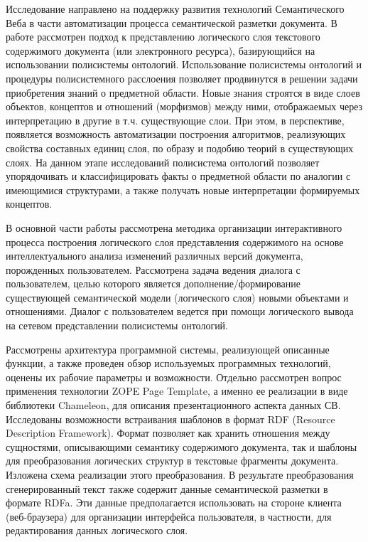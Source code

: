 \documentclass[utf8]{../IncArticle}
\newcommand{\e}[2][fcolor]{\textcolor{pcolor}{[}\textcolor{#1}{#2}\textcolor{pcolor}{]}}
\begin{document}

\conclusion


Исследование направлено на поддержку развития технологий
Семантического Веба в части автоматизации процесса семантической
разметки документа.  В работе рассмотрен подход к представлению
логического слоя текстового содержимого документа (или электронного
ресурса), базирующийся на использовании полисистемы онтологий.
Использование полисистемы онтологий и процедуры полисистемного
расслоения \cite{father} позволяет продвинутся в решении задачи
приобретения знаний о предметной области.  Новые знания строятся в
виде слоев объектов, концептов и отношений (морфизмов) между ними,
отображаемых через интерпретацию в другие в т.ч. существующие слои.
При этом, в перспективе, появляется возможность автоматизации
построения алгоритмов, реализующих свойства составных единиц слоя, по
образу и подобию теорий в существующих слоях.  На данном этапе
исследований полисистема онтологий позволяет упорядочивать и
классифицировать факты о предметной области по аналогии с имеющимися
структурами, а также получать новые интерпретации формируемых
концептов.

В основной части работы рассмотрена методика организации
интерактивного процесса построения логического слоя представления
содержимого на основе интеллектуального анализа изменений различных
версий документа, порожденных пользователем.  Рассмотрена задача
ведения диалога с пользователем, целью которого является
дополнение/формирование существующей семантической модели (логического
слоя) новыми объектами и отношениями.  Диалог с пользователем ведется
при помощи логического вывода на сетевом представлении полисистемы
онтологий.

Рассмотрены архитектура программной системы, реализующей описанные
функции, а также проведен обзор используемых программных технологий,
оценены их рабочие параметры и возможности.  Отдельно рассмотрен
вопрос применения технологии ZOPE Page Template, а именно ее
реализации в виде библиотеки Chameleon, для описания презентационного
аспекта данных СВ.  Исследованы возможности встраивания шаблонов в
формат RDF (Resource Description Framework).  Формат позволяет как
хранить отношения между сущностями, описывающими семантику содержимого
документа, так и шаблоны для преобразования логических структур в
текстовые фрагменты документа.  Изложена схема реализации этого
преобразования.  В результате преобразования сгенерированный текст
также содержит данные семантической разметки в формате RDFa.  Эти
данные предполагается использовать на стороне клиента (веб-браузера)
для организации интерфейса пользователя, в частности, для
редактирования данных логического слоя.
\end{document}
